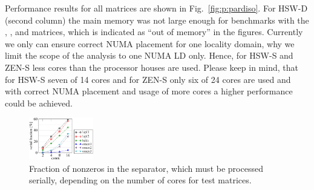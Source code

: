 



Performance results for all matrices are shown in Fig.~\ref{fig:p:pardiso}.
For HSW-D (second column) the main memory was not large enough for benchmarks
with the , , and  matrices, which is
indicated as ``out of memory'' in the figures.
%
%
Currently we only can ensure correct NUMA placement for one locality domain, why
we limit the scope of the analysis to one NUMA LD only. 
Hence, for HSW-S and ZEN-S less cores than the processor houses are used.
Please keep in mind, that for HSW-S seven of 14 cores and for ZEN-S only six of
24 cores are used and with correct NUMA placement and usage of more cores a
higher performance could be achieved.

\begin{figure}%
  \centering%
  \includegraphics[width=0.25\textwidth,clip=true]{images/matrices-serial-fraction}%
  \caption{Fraction of nonzeros in the separator, which must be processed
   serially, depending on the number of cores for test matrices.  }%
  \label{fig:p:serial-fraciton}%
\end{figure}

